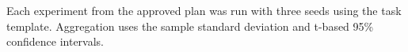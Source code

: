 Each experiment from the approved plan was run with three seeds using the task template. Aggregation uses the sample standard deviation and t-based 95\% confidence intervals.
